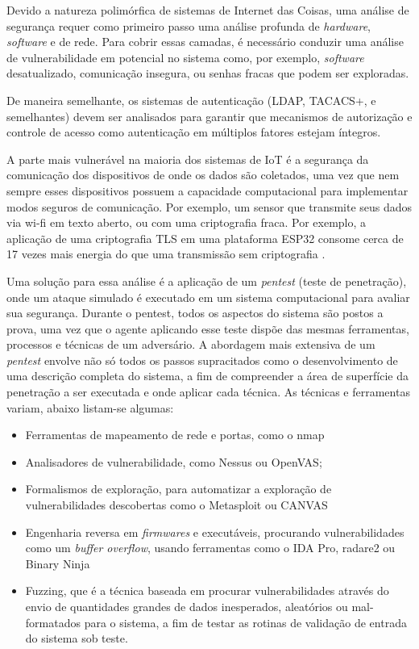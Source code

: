 \documentclass[tcc,capa]{texufpel}
\begin{document}
Devido a natureza polimórfica de sistemas de Internet das Coisas, uma análise de segurança requer como primeiro passo uma análise profunda de \textit{hardware}, \textit{software} e de rede. Para cobrir essas camadas, é necessário conduzir uma análise de vulnerabilidade em potencial no sistema como, por exemplo, \textit{software} desatualizado, comunicação insegura, ou senhas fracas que podem ser exploradas.

De maneira semelhante, os sistemas de autenticação (LDAP, TACACS+, e semelhantes) devem ser analisados para garantir que mecanismos de autorização e controle de acesso como autenticação em múltiplos fatores estejam íntegros.

A parte mais vulnerável na maioria dos sistemas de IoT é a segurança da comunicação dos dispositivos de onde os dados são coletados, uma vez que nem sempre esses dispositivos possuem a capacidade computacional para implementar modos seguros de comunicação. Por exemplo, um sensor que transmite seus dados via wi-fi em texto aberto, ou com uma criptografia fraca. Por exemplo, a aplicação de uma criptografia TLS em uma plataforma ESP32 consome cerca de 17 vezes mais energia do que uma transmissão sem criptografia \cite{fischer}.

Uma solução para essa análise é a aplicação de um \textit{pentest} (teste de penetração), onde um ataque simulado é executado em um sistema computacional para avaliar sua
segurança. Durante o pentest, todos os aspectos do sistema são postos a prova, uma vez que o agente aplicando esse teste dispõe das mesmas ferramentas, processos e técnicas de um
adversário. A abordagem mais extensiva de um \textit{pentest} envolve não só todos os passos supracitados como o desenvolvimento de uma descrição completa do sistema, a fim de compreender a área de superfície da penetração a ser executada e onde aplicar cada técnica. As técnicas e ferramentas variam, abaixo listam-se algumas: 

\begin{itemize}
    \item Ferramentas de mapeamento de rede e portas, como o nmap
    \item Analisadores de vulnerabilidade, como Nessus ou OpenVAS;
    \item Formalismos de exploração, para automatizar a exploração de vulnerabilidades descobertas
    como o Metasploit ou CANVAS
    \item Engenharia reversa em \textit{firmwares} e executáveis, procurando vulnerabilidades como um \textit{buffer overflow}, usando ferramentas como o IDA Pro, radare2 ou Binary Ninja
    \item Fuzzing, que é a técnica baseada em procurar vulnerabilidades através do envio de quantidades grandes de dados inesperados, aleatórios ou mal-formatados para o sistema, a fim de testar as rotinas de validação de entrada do sistema sob teste.
\end{itemize}
\end{document}
